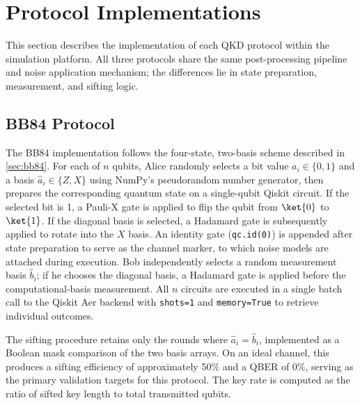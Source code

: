 \section{Protocol Implementations}
\label{sec:protocol-implementations}

This section describes the implementation of each QKD protocol within the simulation platform. All three protocols share the same post-processing pipeline and noise application mechanism; the differences lie in state preparation, measurement, and sifting logic.

\subsection{BB84 Protocol}

The BB84 implementation follows the four-state, two-basis scheme described in \cref{sec:bb84}. For each of $n$ qubits, Alice randomly selects a bit value $a_i \in \{0,1\}$ and a basis $\hat{a}_i \in \{Z, X\}$ using NumPy's pseudorandom number generator, then prepares the corresponding quantum state on a single-qubit Qiskit circuit. If the selected bit is 1, a Pauli-X gate is applied to flip the qubit from $\ket{0}$ to $\ket{1}$. If the diagonal basis is selected, a Hadamard gate is subsequently applied to rotate into the $X$ basis. An identity gate (\texttt{qc.id(0)}) is appended after state preparation to serve as the channel marker, to which noise models are attached during execution. Bob independently selects a random measurement basis $\hat{b}_i$; if he chooses the diagonal basis, a Hadamard gate is applied before the computational-basis measurement. All $n$ circuits are executed in a single batch call to the Qiskit Aer backend with \texttt{shots=1} and \texttt{memory=True} to retrieve individual outcomes.

The sifting procedure retains only the rounds where $\hat{a}_i = \hat{b}_i$, implemented as a Boolean mask comparison of the two basis arrays. On an ideal channel, this produces a sifting efficiency of approximately 50\% and a QBER of 0\%, serving as the primary validation targets for this protocol. The key rate is computed as the ratio of sifted key length to total transmitted qubits.

  {}%

